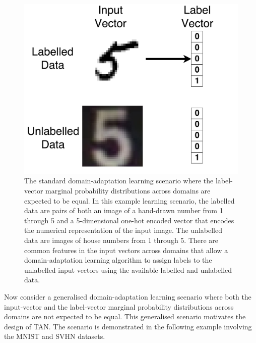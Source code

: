 \documentclass{article}
\begin{document}
\begin{figure}[ht]
\vskip 0.2in
\begin{center}
\centerline{\includegraphics[width=0.6\columnwidth]{example1}}
\caption{The standard domain-adaptation learning scenario where the label-vector marginal probability distributions across domains are expected to be equal. In this example learning scenario, the labelled data are pairs of both an image of a hand-drawn number from 1 through 5 and a 5-dimensional one-hot encoded vector that encodes the numerical representation of the input image. The unlabelled data are images of house numbers from 1 through 5. There are common features in the input vectors across domains that allow a domain-adaptation learning algorithm to assign labels to the unlabelled input vectors using the available labelled and unlabelled data.}
\label{icml-historical}
\end{center}
\vskip -0.2in
\end{figure}
Now consider a generalised domain-adaptation learning scenario where both the input-vector and the label-vector marginal probability distributions across domains are not expected to be equal. This generalised scenario motivates the design of TAN. The scenario is demonstrated in the following example involving the MNIST and SVHN datasets.
\end{document}
